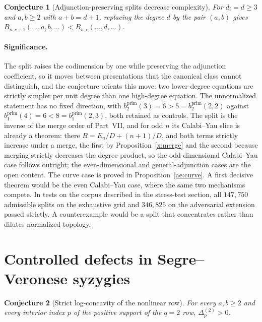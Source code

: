 \documentclass[11pt]{article}
\newtheorem{conjecture}{Conjecture}
\theoremstyle{definition}
\begin{document}
\begin{conjecture}[Adjunction-preserving splits decrease complexity]\label{ae6}
For $d_i=d\ge3$ and $a,b\ge2$ with $a+b=d+1$, replacing the degree $d$ by the pair $(a,b)$ gives $B_{n,c+1}(\ldots,a,b,\ldots)<B_{n,c}(\ldots,d,\ldots)$.
\end{conjecture}

\paragraph{Significance.}
The split raises the codimension by one while preserving the adjunction coefficient, so it moves between presentations that the canonical class cannot distinguish, and the conjecture orients this move: two lower-degree equations are strictly simpler per unit degree than one high-degree equation.  The unnormalized statement has no fixed direction, with $b_2^{\mathrm{prim}}(3)=6>5=b_2^{\mathrm{prim}}(2,2)$ against $b_1^{\mathrm{prim}}(4)=6<8=b_1^{\mathrm{prim}}(2,3)$, both retained as controls.  The split is the inverse of the merge order of Part~VII, and for odd $n$ its Calabi--Yau slice is already a theorem: there $B=E_n/D+(n+1)/D$, and both terms strictly increase under a merge, the first by Proposition~\ref{x:merge} and the second because merging strictly decreases the degree product, so the odd-dimensional Calabi--Yau case follows outright; the even-dimensional and general-adjunction cases are the open content.  The curve case is proved in Proposition~\ref{ae:curve}.  A first decisive theorem would be the even Calabi--Yau case, where the same two mechanisms compete.  In tests on the corpus described in the stress-test section, all $147{,}750$ admissible splits on the exhaustive grid and $346{,}825$ on the adversarial extension passed strictly.  A counterexample would be a split that concentrates rather than dilutes normalized topology.

\section{Controlled defects in Segre--Veronese syzygies}

\begin{conjecture}[Strict log-concavity of the nonlinear row]\label{ae7}
For every $a,b\ge2$ and every interior index $p$ of the positive support of the $q=2$ row, $\Delta^{(2)}_p>0$.
\end{conjecture}
\end{document}
